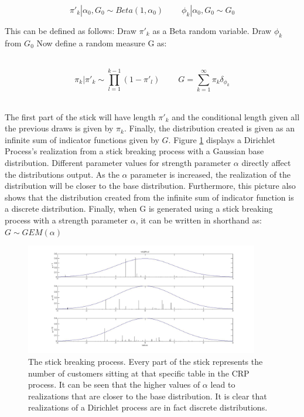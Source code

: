 \documentclass [twoside,hidelinks]{article}
\begin{document}
  \begin{equation}
\pi'_k  | \alpha_0, G_0 \sim Beta (1, \alpha_0)\ \ \ \ \ \ \ \ \ \   \phi_k | \alpha_0, G_0 \sim G_0
\end{equation}



This can be defined as follows: Draw $\pi'_k$ as a Beta random variable. Draw $\phi_k$ from $G_0$ Now define a random measure G as:


\ \
\begin{equation}
\pi_k  | \pi'_k \sim \prod_{l=1}^{k-1} (1- \pi'_l) \ \ \ \ \ \ \ \ \ \     G = \sum_{k=1}^\infty \pi_k \delta_{\phi_k} 
\end{equation}
\ \

The first part of the stick will have length $\pi'_k$ and the conditional length given all the previous draws is given by $\pi_k$. Finally, the distribution created is given as an infinite sum of indicator functions given by $G$. Figure \ref{crpGausBase} displays a Dirichlet Process's realization from a stick breaking process with a Gaussian base distribution. Different parameter values for strength parameter $\alpha$ directly affect the distributions output. As the $\alpha$ parameter is increased, the realization of the distribution will be closer to the base distribution. Furthermore, this picture also shows that the distribution created from the infinite sum of indicator function is a discrete distribution. Finally, when G is generated using a stick breaking process with a strength parameter $\alpha$, it can be written in shorthand as: $ G \sim GEM (\alpha) $

\begin{figure} [h!]
          \centerline{\includegraphics [width=0.91\textwidth]{stickBreakGaus}}
	\caption{The stick breaking process. Every part of the stick represents the number of customers sitting at that specific table in the CRP process. It can be seen that the higher values of $\alpha$ lead to realizations that are closer to the base distribution. It is clear that realizations of a Dirichlet process are in fact discrete distributions.}
	\label{crpGausBase}
\end{figure}
\end{document}
